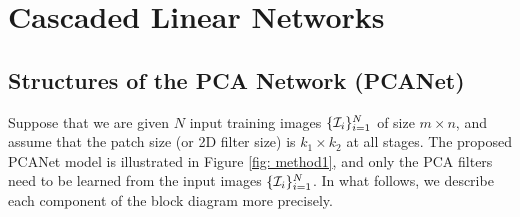 \documentclass[10pt,journal,compsoc]{IEEEtran}
\begin{document}
\section{Cascaded Linear Networks}\label{sec: PCANet}

\begin{figure*}[htbp]
\centering
{}
\caption{The detailed block diagram of the proposed (two-stage) PCANet.} \label{fig: method1}\vspace{-0.2cm}
\vspace{0cm}
\end{figure*}

\subsection{Structures of the PCA Network (PCANet)}\label{sec: PCANet_main}
Suppose that we are given $N$ input training images $\{{\cal I}_i\}_{i=1}^N$ of size $m\times n$, and assume that the patch size (or 2D filter size) is $k_1 \times k_2$ at all stages. The proposed PCANet model is illustrated in Figure \ref{fig: method1}, and only the PCA filters need to be learned from the input images $\{{\cal I}_i\}_{i=1}^N$. In what follows, we describe each component of the block diagram more precisely.
\end{document}
